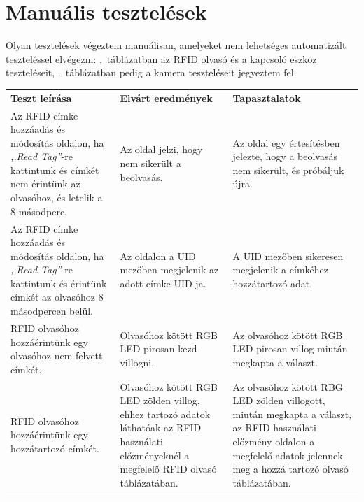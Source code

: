 \documentclass[
]{thesis-ekf}
\theoremstyle{definition}
\theoremstyle{remark}
\begin{document}
	\section{Manuális tesztelések}
	Olyan tesztelések végeztem manuálisan, amelyeket nem lehetséges automatizált teszteléssel elvégezni: .~táblázatban az RFID olvasó és a kapcsoló eszköz teszteléseit, .~táblázatban pedig a kamera teszteléseit jegyeztem fel.
	\begin{table}
		\begin{tabular}{|p{}|p{}|p{}|}
			\hline
			\rowcolor[HTML]{C0C0C0} 
			{\color[HTML]{333333} \textbf{Teszt leírása}} &
			{\color[HTML]{333333} \textbf{Elvárt eredmények}} &
			{\color[HTML]{333333} \textbf{Tapasztalatok}}
			\\
			\rowcolor[HTML]{EFEFEF} 
				Az RFID címke hozzáadás és módosítás oldalon, ha \emph{,,Read Tag''}-re kattintunk és címkét nem érintünk az olvasóhoz, és letelik a 8 másodperc. &
				 
				Az oldal jelzi, hogy nem sikerült a beolvasás. &
			
				Az oldal egy értesítésben jelezte, hogy a beolvasás nem sikerült, és próbáljuk újra.
				 \\
				Az RFID címke hozzáadás és módosítás oldalon, ha \emph{,,Read Tag''}-re kattintunk és érintünk  címkét az olvasóhoz 8 másodpercen belül. &
				
				Az oldalon a UID mezőben megjelenik az adott címke UID-ja. &
			
				A UID mezőben sikeresen megjelenik a címkéhez hozzátartozó adat.
				  \\
			\rowcolor[HTML]{EFEFEF} 
				RFID olvasóhoz hozzáérintünk egy olvasóhoz nem felvett
				címkét. &
			
				Olvasóhoz kötött RGB LED pirosan kezd villogni. &
			
				Az olvasóhoz kötött RGB LED pirosan villog miután megkapta a választ. 
				\\
			
				RFID olvasóhoz hozzáérintünk egy hozzátartozó címkét. &
			
				Olvasóhoz kötött RGB LED zölden villog, ehhez tartozó adatok láthatóak az RFID használati előzményeknél a megfelelő RFID olvasó táblázatában. &
			
				Az olvasóhoz kötött RBG LED zölden villogott, miután megkapta a választ, az RFID használati előzmény oldalon a megfelelő adatok jelennek meg a hozzá tartozó olvasó táblázatában.\\
				\rowcolor[HTML]{EFEFEF} 
				

\end{tabular}
\end{table}
\end{document}
